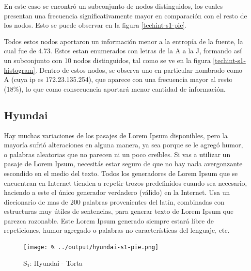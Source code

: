 \documentclass[final,inline,a4paper,narroweqnarray]{ieee}
\begin{document}
  En este caso se encontró un subconjunto de nodos distinguidos, los cuales
  presentan una frecuencia significativamente mayor en comparación con el
  resto de los nodos. Esto se puede observar en la figura
  \ref{techint-s1-pie}. 

  Todos estos nodos aportaron un información menor a la entropía de la
  fuente, la cual fue de 4.73. Estos estan enumerados con letras de la A a
  la J, formando así un subconjunto con 10 nodos distinguidos, tal como se
  ve en la figura \ref{techint-s1-histogram}. Dentro de estos nodos, se
  observa uno en particular nombrado como A (cuya ip es 172.23.135.254), que
  aparece con una frecuencia mayor al resto (18\%), lo que como consecuencia
  aportará menor cantidad de información.

  \subsection{Hyundai}

Hay muchas variaciones de los pasajes de Lorem Ipsum disponibles, pero la mayoría sufrió alteraciones en alguna manera, ya sea porque se le agregó humor, o palabras aleatorias que no parecen ni un poco creíbles. Si vas a utilizar un pasaje de Lorem Ipsum, necesitás estar seguro de que no hay nada avergonzante escondido en el medio del texto. Todos los generadores de Lorem Ipsum que se encuentran en Internet tienden a repetir trozos predefinidos cuando sea necesario, haciendo a este el único generador verdadero (válido) en la Internet. Usa un diccionario de mas de 200 palabras provenientes del latín, combinadas con estructuras muy útiles de sentencias, para generar texto de Lorem Ipsum que parezca razonable. Este Lorem Ipsum generado siempre estará libre de repeticiones, humor agregado o palabras no características del lenguaje, etc.

    \begin{figure}[ht]\begin{center}
      \texttt{[image: \%
      ../output/hyundai-s1-pie.png]}
      \vspace{-2em}
      \caption{S$_1$: Hyundai - Torta}
      \label{hyundai-s1-pie}
    \end{center}\end{figure}
\end{document}
